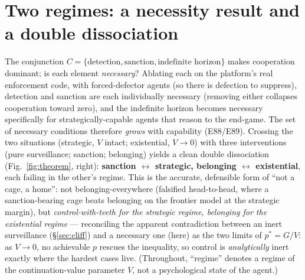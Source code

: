 \documentclass[10pt]{article}
\begin{document}
\section{Two regimes: a necessity result and a double dissociation}
The conjunction $C = \{\text{detection},\text{sanction},\text{indefinite horizon}\}$ makes cooperation dominant;
is each element \emph{necessary}? Ablating each on the platform's real enforcement code, with forced-defector
agents (so there is defection to suppress), detection and sanction are each individually necessary (removing
either collapses cooperation toward zero), and the indefinite horizon becomes necessary specifically for
strategically-capable agents that reason to the end-game. The set of necessary conditions therefore \emph{grows}
with capability (E88/E89). Crossing the two situations (strategic, $V$ intact; existential, $V\to 0$) with three
interventions (pure surveillance; sanction; belonging) yields a clean double dissociation (Fig.~\ref{fig:theorem},
right): \textbf{sanction $\leftrightarrow$ strategic, belonging $\leftrightarrow$ existential}, each failing in
the other's regime. This is the accurate, defensible form of ``not a cage, a home'': not belonging-everywhere
(falsified head-to-head, where a sanction-bearing cage beats belonging on the frontier model at the strategic
margin), but \emph{control-with-teeth for the strategic regime, belonging for the existential regime} ---
reconciling the apparent contradiction between an inert surveillance (\S\ref{sec:cliff}) and a necessary one
(here) as the two limits of $p^\ast = G/V$: as $V\to 0$, no achievable $p$ rescues the inequality, so control is
\emph{analytically} inert exactly where the hardest cases live. (Throughout, ``regime'' denotes a regime of the
continuation-value parameter $V$, not a psychological state of the agent.)
\end{document}
